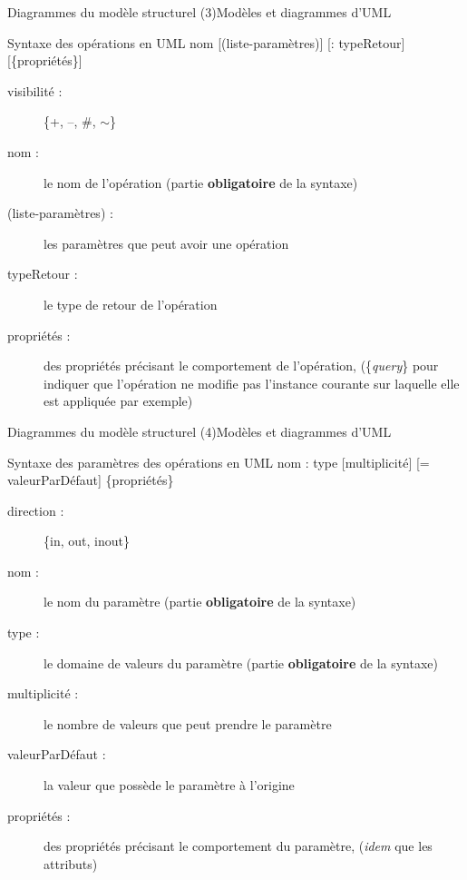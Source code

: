 \documentclass{beamer}
\begin{document}
    \begin{frame}{Diagrammes du modèle structurel (3)}{Modèles et diagrammes d'UML}
      \begin{block}{Syntaxe des opérations en UML}
        \og [visibilité] nom [(liste-paramètres)] [: typeRetour] [\{propriétés\}] \fg{}
        \begin{description}
          \item[visibilité :]{\{+, --, \#, $\sim$\}}
          \item[nom :]{le nom de l'opération (partie \textbf{obligatoire} de la syntaxe)}
          \item[(liste-paramètres) :]{les paramètres que peut avoir une opération}
          \item[typeRetour :]{le type de retour de l'opération}
          \item[propriétés :]{des propriétés précisant le comportement de l'opération, (\{\textit{query}\} pour indiquer que l'opération ne modifie pas l'instance courante sur laquelle elle est appliquée par exemple)}
        \end{description}
      \end{block}
    \end{frame}

    \begin{frame}{Diagrammes du modèle structurel (4)}{Modèles et diagrammes d'UML}
      \begin{block}{Syntaxe des paramètres des opérations en UML}
        \og [direction] nom : type [multiplicité] [= valeurParDéfaut] \{propriétés\} \fg{}
        \begin{description}
          \item[direction :]{\{in, out, inout\}}
          \item[nom :]{le nom du paramètre (partie \textbf{obligatoire} de la syntaxe)}
          \item[type :]{le domaine de valeurs du paramètre (partie \textbf{obligatoire} de la syntaxe)}
          \item[multiplicité :]{le nombre de valeurs que peut prendre le paramètre}
          \item[valeurParDéfaut :]{la valeur que possède le paramètre à l'origine}
          \item[propriétés :]{des propriétés précisant le comportement du paramètre, (\textit{idem} que les attributs)}
        \end{description}
      \end{block}
    \end{frame}
\end{document}
